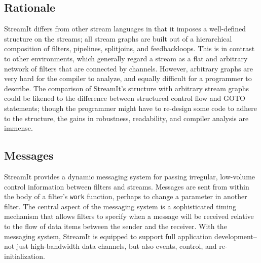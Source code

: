 \subsection{Rationale}

StreamIt differs from other stream languages in that it imposes a
well-defined structure on the streams; all stream graphs are built out
of a hierarchical composition of filters, pipelines, splitjoins, and
feedbackloops.  This is in contrast to other environments, which
generally regard a stream as a flat and arbitrary network of filters
that are connected by channels.  However, arbitrary graphs are very
hard for the compiler to analyze, and equally difficult for a
programmer to describe.  The comparison of StreamIt's structure with
arbitrary stream graphs could be likened to the difference between
structured control flow and GOTO statements; though the programmer
might have to re-design some code to adhere to the structure, the
gains in robustness, readability, and compiler analysis are immense.

\subsection{Messages}

StreamIt provides a dynamic messaging system for passing irregular,
low-volume control information between filters and streams.  Messages
are sent from within the body of a filter's {\tt work} function,
perhaps to change a parameter in another filter.  The central aspect
of the messaging system is a sophisticated timing mechanism that
allows filters to specify when a message will be received relative to
the flow of data items between the sender and the receiver.  With the
messaging system, StreamIt is equipped to support full application
development--not just high-bandwidth data channels, but also events,
control, and re-initialization.
